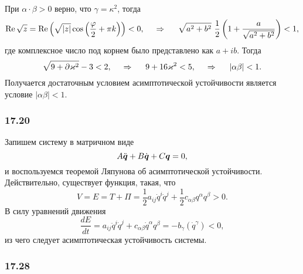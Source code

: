 При $\alpha \cdot \beta > 0$ верно, что $\gamma = \kappa^2$, тогда
\begin{equation*}
    \Re \sqrt{z} = \Re \left(
        \sqrt{|z|} \cos \left(
            \frac{\varphi}{2} + \pi k
        \right)
    \right) < 0,
    \hspace{0.5cm} \Rightarrow \hspace{0.5cm}
    \sqrt{a^2 + b^2} \ \frac{1}{2} \left(
        1 + \frac{a}{\sqrt{a^2 + b^2}}
    \right) < 1,
\end{equation*}
где комплексное число под корнем было представлено как $a + ib$. Тогда
\begin{equation*}
    \sqrt{9 + \partial \kappa^2} - 3 < 2,
    \hspace{0.5cm} \Rightarrow \hspace{0.5cm}
    9 + 16 \kappa^2 < 5, 
    \hspace{0.5cm} \Rightarrow \hspace{0.5cm}
    |\alpha \beta|  < 1.
\end{equation*}
Получается достаточным условием асимптотической устойчивости является условие $|\alpha \beta| < 1$.




\subsubsection*{17.20}

Запишем систему в матричном виде
\begin{equation*}
    A \ddot{\vc{q}} + B \dot{\vc{q}} + C \vc{q} = 0,
\end{equation*}
и воспользуемся теоремой Ляпунова об асимптотической устойчивости. Действительно, существует функция, такая, что
\begin{equation*}
    V = E = T + \Pi = \frac{1}{2} a_{ij} \dot{q}^i \dot{q}^j + \frac{1}{2} c_{\alpha \beta} q^{\alpha} q^{\beta} > 0.
\end{equation*}
В силу уравнений движения
\begin{equation*}
    \frac{d E}{d t} = a_{ij} \ddot{q}^i \dot{q}^j + c_{\alpha \beta} \dot{q}^\alpha q^\beta = - b_\gamma (\dot{q}^\gamma) < 0,
\end{equation*}
из чего следует асимптотическая устойчивость системы.


\subsubsection*{17.28}

